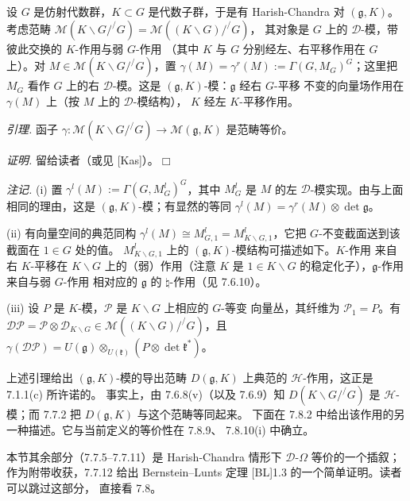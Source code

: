  设 $G$ 是仿射代数群，$K\subset G$ 是代数子群，于是有
Harish-Chandra 对 $(\mathfrak{g},K)$。考虑范畴
$\mathcal{M}(K\backslash G/^{/}G)=\mathcal{M}((K\backslash G)/^{/}G)$，
其对象是 $G$ 上的 $\mathcal{D}$-模，带彼此交换的 $K$-作用与弱 $G$-作用
（其中 $K$ 与 $G$ 分别经左、右平移作用在 $G$ 上）。对
$M\in\mathcal{M}(K\backslash G/^{/}G)$，置
$\gamma(M)=\gamma^r(M):=\Gamma(G,M_G)^G$；这里把 $M_G$ 看作 $G$ 上的右
$\mathcal{D}$-模。这是 $(\mathfrak{g},K)$-模：$\mathfrak{g}$ 经右 $G$-平移
不变的向量场作用在 $\gamma(M)$ 上（按 $M$ 上的 $\mathcal{D}$-模结构），
$K$ 经左 $K$-平移作用。

 \emph{引理.} 函子
$\gamma:\mathcal{M}(K\backslash G/^{/}G)\to\mathcal{M}(\mathfrak{g},K)$
是范畴等价。

\emph{证明.} 留给读者（或见 [Kas]）。\hfill$\Box$

 \emph{注记.} (i) 置 $\gamma^l(M):=\Gamma(G,M^l_G)^G$，其中
$M^l_G$ 是 $M$ 的左 $\mathcal{D}$-模实现。由与上面相同的理由，这是
$(\mathfrak{g},K)$-模；有显然的等同
$\gamma^l(M)=\gamma^r(M)\otimes\det\mathfrak{g}$。

(ii) 有向量空间的典范同构 $\gamma^l(M)\cong M^l_{G,1}
=M^l_{K\backslash G,1}$，它把 $G$-不变截面送到该截面在 $1\in G$ 处的值。
$M^l_{K\backslash G,1}$ 上的 $(\mathfrak{g},K)$-模结构可描述如下。$K$-作用
来自右 $K$-平移在 $K\backslash G$ 上的（弱）作用（注意 $K$ 是
$1\in K\backslash G$ 的稳定化子），$\mathfrak{g}$-作用来自与弱 $G$-作用
相对应的 $\mathfrak{g}$ 的 $\natural$-作用（见 7.6.10）。

(iii) 设 $P$ 是 $K$-模，$\mathcal{P}$ 是 $K\backslash G$ 上相应的 $G$-等变
向量丛，其纤维为 $\mathcal{P}_1=P$。有
$\mathcal{D}\mathcal{P}=\mathcal{P}\otimes\mathcal{D}_{K\backslash G}
\in\mathcal{M}((K\backslash G)/^{/}G)$，且
$\gamma(\mathcal{D}\mathcal{P})=U(\mathfrak{g})\otimes_{U(\mathfrak{k})}
(P\otimes\det\mathfrak{k}^*)$。

 上述引理给出 $(\mathfrak{g},K)$-模的导出范畴
$D(\mathfrak{g},K)$ 上典范的 $\mathcal{H}$-作用，这正是 7.1.1(c) 所许诺的。
事实上，由 7.6.8(v)（以及 7.6.9）知 $D(K\backslash G/^{/}G)$ 是
$\mathcal{H}$-模；而 7.7.2 把 $D(\mathfrak{g},K)$ 与这个范畴等同起来。
下面在 7.8.2 中给出该作用的另一种描述。它与当前定义的等价性在 7.8.9、
7.8.10(i) 中确立。


本节其余部分（7.7.5--7.7.11）是 Harish-Chandra 情形下
$\mathcal{D}$-$\Omega$ 等价的一个插叙；作为附带收获，7.7.12 给出
Bernstein--Lunts 定理 [BL]1.3 的一个简单证明。读者可以跳过这部分，
直接看 7.8。

